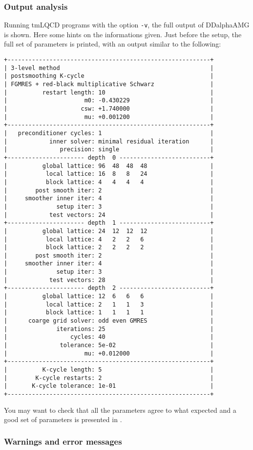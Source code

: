 \subsubsection{Output analysis}
Running tmLQCD programs with the option \texttt{-v}, the full output of DDalphaAMG is shown. Here some hints on the informations given. Just before the setup, the full set of parameters is printed, with an output similar to the following:
\begin{Verbatim}[fontsize=\small]
+----------------------------------------------------------+
| 3-level method                                           |
| postsmoothing K-cycle                                    |
| FGMRES + red-black multiplicative Schwarz                |
|          restart length: 10                              |
|                      m0: -0.430229                       |
|                     csw: +1.740000                       |
|                      mu: +0.001200                       |
+----------------------------------------------------------+
|   preconditioner cycles: 1                               |
|            inner solver: minimal residual iteration      |
|               precision: single                          |
+---------------------- depth  0 --------------------------+
|          global lattice: 96  48  48  48                  |
|           local lattice: 16  8   8   24                  |
|           block lattice: 4   4   4   4                   |
|        post smooth iter: 2                               |
|     smoother inner iter: 4                               |
|              setup iter: 3                               |
|            test vectors: 24                              |
+---------------------- depth  1 --------------------------+
|          global lattice: 24  12  12  12                  |
|           local lattice: 4   2   2   6                   |
|           block lattice: 2   2   2   2                   |
|        post smooth iter: 2                               |
|     smoother inner iter: 4                               |
|              setup iter: 3                               |
|            test vectors: 28                              |
+---------------------- depth  2 --------------------------+
|          global lattice: 12  6   6   6                   |
|           local lattice: 2   1   1   3                   |
|           block lattice: 1   1   1   1                   |
|      coarge grid solver: odd even GMRES                  |
|              iterations: 25                              |
|                  cycles: 40                              |
|               tolerance: 5e-02                           |
|                      mu: +0.012000                       |
+----------------------------------------------------------+
|          K-cycle length: 5                               |
|        K-cycle restarts: 2                               |
|       K-cycle tolerance: 1e-01                           |
+----------------------------------------------------------+
\end{Verbatim}
You may want to check that all the parameters agree to what expected and a good set of parameters is presented in \cite{Alexandrou:2016}.
\subsubsection{Warnings and error messages}





